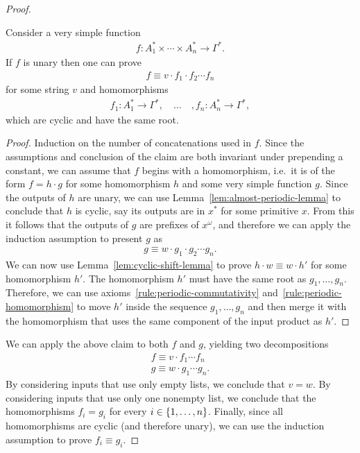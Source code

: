 \begin{proof}
    \begin{claim}
        Consider a very simple function
        \begin{align*}
        f  :  A_1^* \times \cdots \times A_n^* \to \Gamma^*.
        \end{align*}
        If $f$ is unary then  one can prove 
        \begin{align*}
        f  \equiv v \cdot f_1 \cdot f_2 \cdots f_n 
        \end{align*}
        for some string $v$ and 
        homomorphisms
        \begin{align*}
        f_1 : A_1^* \to \Gamma^*, \quad \ldots \quad, f_n : A_n^* \to \Gamma^*,
        \end{align*}
        which are cyclic and have the same root.
    \end{claim}
    \begin{proof}
        Induction on the number of concatenations used in $f$. Since the assumptions and conclusion of the claim are both invariant under prepending a constant, we can assume that $f$ begins with a homomorphism, i.e.~it is of the form $f = h \cdot g$ for some homomorphism $h$ and some very simple function $g$. Since the outputs of $h$ are unary, we can use Lemma~\ref{lem:almost-periodic-lemma} to conclude that $h$ is cyclic, say its outputs are in $x^*$ for some primitive $x$. From this it follows that the outputs of $g$ are prefixes of $x^\omega$, and therefore we can apply the induction assumption to present $g$ as 
        \begin{align*}
        g \equiv w \cdot g_1 \cdot g_2 \cdots g_n.
        \end{align*}
        We can now use Lemma~\ref{lem:cyclic-shift-lemma} to prove $h \cdot w \equiv w \cdot h'$ for some homomorphism $h'$. The homomorphism $h'$ must have the same root as $g_1,\ldots,g_n$. Therefore, we can use axioms~\ref{rule:periodic-commutativity} and~\ref{rule:periodic-homomorphism} to move $h'$ inside the sequence $g_1,\ldots,g_n$ and then merge it with the homomorphism that uses the same component of the input product as $h'$.
    \end{proof}

    We can apply the above claim to both $f$ and $g$, yielding two decompositions 
    \begin{align*}
    f \equiv v \cdot f_1 \cdots f_n \\
    g \equiv w \cdot g_1 \cdots g_n.
    \end{align*}
    By considering inputs that use only empty lists, we conclude that $v = w$. By considering inputs that use only one nonempty list, we conclude that the homomorphisms $f_i = g_i$ for every $i \in \{1,\ldots,n\}$.  Finally, since all homomorphisms are cyclic (and therefore unary), we can use the induction assumption to prove $f_i \equiv g_i$. 
\end{proof}











